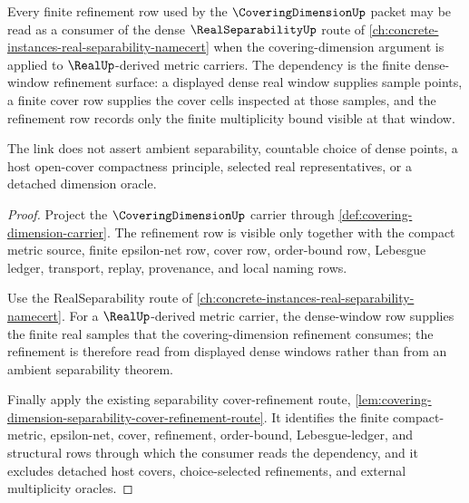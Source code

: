 \begin{theorem}
\label{thm:coveringdimension-real-separability-forward-link}
Every finite refinement row used by the $\CoveringDimensionUp$ packet may be read as a consumer of the dense $\RealSeparabilityUp$ route of \autoref{ch:concrete-instances-real-separability-namecert} when the covering-dimension argument is applied to $\RealUp$-derived metric carriers. The dependency is the finite dense-window refinement surface: a displayed dense real window supplies sample points, a finite cover row supplies the cover cells inspected at those samples, and the refinement row records only the finite multiplicity bound visible at that window.

The link does not assert ambient separability, countable choice of dense points, a host open-cover compactness principle, selected real representatives, or a detached dimension oracle.
\end{theorem}
\begin{proof}
Project the $\CoveringDimensionUp$ carrier through \autoref{def:covering-dimension-carrier}. The refinement row is visible only together with the compact metric source, finite epsilon-net row, cover row, order-bound row, Lebesgue ledger, transport, replay, provenance, and local naming rows.

Use the RealSeparability route of \autoref{ch:concrete-instances-real-separability-namecert}. For a $\RealUp$-derived metric carrier, the dense-window row supplies the finite real samples that the covering-dimension refinement consumes; the refinement is therefore read from displayed dense windows rather than from an ambient separability theorem.

Finally apply the existing separability cover-refinement route, \autoref{lem:covering-dimension-separability-cover-refinement-route}. It identifies the finite compact-metric, epsilon-net, cover, refinement, order-bound, Lebesgue-ledger, and structural rows through which the consumer reads the dependency, and it excludes detached host covers, choice-selected refinements, and external multiplicity oracles.
\end{proof}

